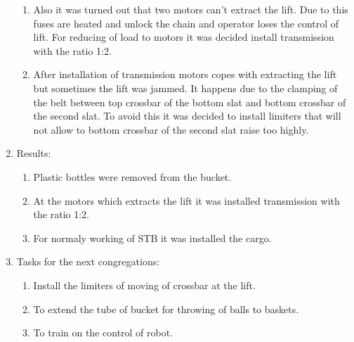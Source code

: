 \begin{enumerate}
\begin{enumerate}
      \item Also it was turned out that two motors can't extract the lift. Due to this fuses are heated and unlock the chain and operator loses the control of lift. For reducing of load to motors it was decided install transmission with the ratio 1:2.
      
      
      \item After installation of transmission motors copes with extracting the lift but sometimes the lift was jammed. It happens due to the  clamping of the belt between top crossbar of the bottom slat and bottom crossbar of the second slat. To avoid this it was decided to install limiters that will not allow to bottom crossbar of the second slat raise too highly.
          
    \end{enumerate}
    
	\item Results:
	\begin{enumerate}
	  \item Plastic bottles were removed from the bucket. 
	  
      \item At the motors which extracts the lift it was installed transmission with the ratio 1:2.
      
      \item For normaly working of STB it was installed the cargo.
    \end{enumerate}
    
	\item Tasks for the next congregations:
	\begin{enumerate}
	  \item Install the limiters of moving of crossbar at the lift.
	  
	  \item To extend the tube of bucket for throwing of balls to baskets.
	  
	  \item To train on the control of robot.

    \end{enumerate}     
\end{enumerate}
\fillpage